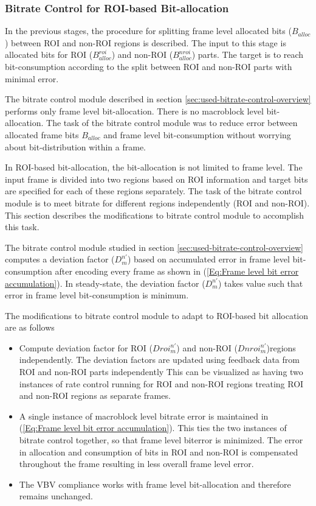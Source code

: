 \documentclass[11pt]{article} %
\begin{document}
\subsubsection{Bitrate Control for ROI-based Bit-allocation}
In the previous stages, the procedure for splitting frame level allocated bits ({$B_{alloc}$}) between ROI and non-ROI regions is described. The input to this stage is allocated bits for ROI ($B_{alloc}^{roi}$) and non-ROI ($B_{alloc}^{nroi}$) parts. The target is to reach bit-consumption according to the split between ROI and non-ROI parts with minimal error. 

The bitrate control module described in section \ref{sec:used-bitrate-control-overview} performs only frame level bit-allocation. There is no macroblock level bit-allocation. The task of the bitrate control module was to reduce error between allocated frame bits $B_{alloc}$ and frame level bit-consumption without worrying about bit-distribution within a frame. 

In ROI-based bit-allocation, the bit-allocation is not limited to frame level. The input frame is divided into two regions based on ROI information and target bits are specified for each of these regions separately. The task of the bitrate control module is to meet bitrate for different regions independently (ROI and non-ROI). This section describes the modifications to bitrate control module  to accomplish this task.

The bitrate control module studied in section \ref{sec:used-bitrate-control-overview} computes a deviation factor ($D_m^{n'}$) based on accumulated error in frame level bit-consumption after encoding every frame as shown in (\ref{Eq:Frame level bit error accumulation}). In steady-state, the deviation factor ($D_m^{n'}$) takes value such that error in frame level bit-consumption is minimum. 

The modifications to bitrate control module to adapt to ROI-based bit allocation are as follows
\begin{itemize}
	\item Compute deviation factor for ROI ($Droi_m^{n'}$) and non-ROI ($Dnroi_m^{n'}$)regions independently. The deviation factors are updated using feedback data from ROI and non-ROI parts independently This can be visualized as having two instances of rate control running for ROI and non-ROI regions treating ROI and non-ROI regions as separate frames.
	\item A single instance of macroblock level bitrate error is maintained in (\ref{Eq:Frame level bit error accumulation}). This ties the two instances of bitrate control together, so that frame level biterror is minimized. The error in allocation and consumption of bits in ROI and non-ROI is compensated throughout the frame resulting in less overall frame level error.
	\item The VBV compliance works with frame level bit-allocation and therefore remains unchanged.
\end{itemize} 
\end{document}
